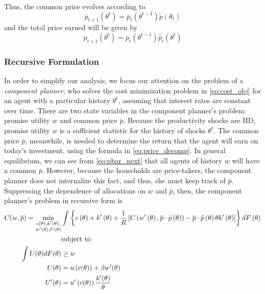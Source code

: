 \documentclass[11pt]{article}
\begin{document}
Thus, the common price evolves according to 
\begin{equation}
    \overline{p}_{t+1}\left(\theta^{t}\right)=\overline{p}_{t}\left(\theta^{t-1}\right)\tilde{p}\left(\theta_{t}\right) \label{eq:pbar_next}
\end{equation}
and the total price earned will be given by 
\begin{equation}
    p_{t+1}\left(\theta^{t}\right)=\overline{p}_{t}\left(\theta^{t-1}\right)\hat{p}_{t}\left(\theta^{t}\right) \label{eq:price_decomp}
\end{equation}
\subsubsection{Recursive Formulation}
In order to simplify our analysis, we focus our attention on the problem of a \textit{component planner}, who solves the cost minimization problem in \eqref{eq:cost_obj} for an agent with a particular history \( \theta^t \), assuming that interest rates are constant over time. There are two state variables in the component planner's problem: promise utility \( w \) and common price \( \bar{p} \). Because the productivity shocks are IID, promise utility \( w \) is a sufficient statistic for the history of shocks \( \theta^t \). The common price \( \bar{p} \), meanwhile, is needed to determine the return that the agent will earn on today's investment, using the formula in \eqref{eq:price_decomp}. In general equilibrium, we can see from \eqref{eq:pbar_next} that all agents of history \( w \) will have a common \( \bar{p} \). However, because the households are price-takers, the component planner does not internalize this fact, and thus, she must keep track of \( \bar{p} \). Suppressing the dependence of allocations on \( w \) and \( \bar{p} \), then, the component planner's problem in recursive form is 
\begin{align}
    C(w,\overline{p})=\min_{\substack{c(\theta),k^{\prime}(\theta),\\
w^{\prime}(\theta),U(\theta) \label{eq:dyn_cmp}
}
}&\int\left\{ c\left(\theta\right)+k^{\prime}\left(\theta\right)+\frac{1}{R}\left[C\left(w^{\prime}\left(\theta\right),\overline{p}\cdot\tilde{p}\left(\theta\right)\right)-\overline{p}\cdot\hat{p}\left(\theta\right)\theta k^{\prime}\left(\theta\right)\right]\right\} dF\left(\theta\right)\\
&\text{subject to} \notag \label{eq:dyn_pkc} \\
\int U(\theta)dF(\theta)&\ge w\\
U(\theta)&=u\left(c(\theta)\right)+\beta w^{\prime}(\theta)\\U^{\prime}(\theta)&=u^{\prime}\left(c(\theta)\right)\frac{k^{\prime}(\theta)}{\theta} \label{eq:dyn_lic}
\end{align}
\end{document}

